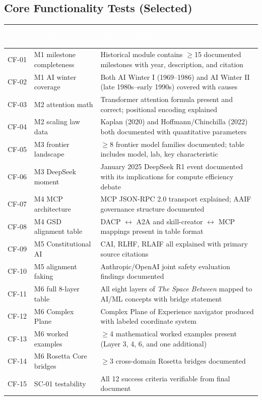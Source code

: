 \documentclass[11pt,letterpaper]{article}
\newcommand{\tableheader}[1]{\textbf{\sffamily\textcolor{white}{#1}}}
\begin{document}
\subsection{Core Functionality Tests (Selected)}

\begin{center}
\begin{tabularx}{\textwidth}{C{1.5cm}L{3.5cm}X}
\toprule
{}
\tableheader{Test ID} & \tableheader{Verifies} & \tableheader{Expected Behavior} \\
\midrule
CF-01 & M1 milestone completeness & Historical module contains $\geq$15 documented milestones with year, description, and citation \\
CF-02 & M1 AI winter coverage & Both AI Winter I (1969--1986) and AI Winter II (late 1980s--early 1990s) covered with causes \\
CF-03 & M2 attention math & Transformer attention formula present and correct; positional encoding explained \\
CF-04 & M2 scaling law data & Kaplan (2020) and Hoffmann/Chinchilla (2022) both documented with quantitative parameters \\
CF-05 & M3 frontier landscape & $\geq$8 frontier model families documented; table includes model, lab, key characteristic \\
CF-06 & M3 DeepSeek moment & January 2025 DeepSeek R1 event documented with its implications for compute efficiency debate \\
CF-07 & M4 MCP architecture & MCP JSON-RPC 2.0 transport explained; AAIF governance structure documented \\
CF-08 & M4 GSD alignment table & DACP $\leftrightarrow$ A2A and skill-creator $\leftrightarrow$ MCP mappings present in table format \\
CF-09 & M5 Constitutional AI & CAI, RLHF, RLAIF all explained with primary source citations \\
CF-10 & M5 alignment faking & Anthropic/OpenAI joint safety evaluation findings documented \\
CF-11 & M6 full 8-layer table & All eight layers of \textit{The Space Between} mapped to AI/ML concepts with bridge statement \\
CF-12 & M6 Complex Plane & Complex Plane of Experience navigator produced with labeled coordinate system \\
CF-13 & M6 worked examples & $\geq$4 mathematical worked examples present (Layer 3, 4, 6, and one additional) \\
CF-14 & M6 Rosetta Core bridges & $\geq$3 cross-domain Rosetta bridges documented \\
CF-15 & SC-01 testability & All 12 success criteria verifiable from final document \\
\bottomrule
\end{tabularx}
\end{center}
\end{document}

